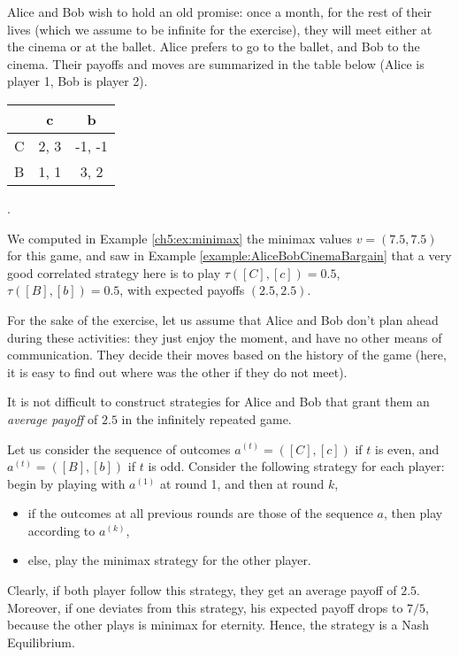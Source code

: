 \begin{example}
Alice and Bob wish to hold an old promise: once a month, for the rest of their lives (which we assume to be infinite for the exercise), they will meet either at the cinema or at the ballet.
Alice prefers to go to the ballet, and Bob to the cinema.
Their payoffs and moves are summarized in the table below (Alice is player 1, Bob is player 2).
\begin{center}
\begin{tabular}{c | c  c}
& c & b\\
\hline
C & 2, 3 & -1, -1  \\
B & 1, 1 & 3, 2
\end{tabular}
.
\end{center}
We computed in Example \ref{ch5:ex:minimax} the minimax values
$v = (7.5, 7.5)$
for this game, and saw in Example \ref{example:AliceBobCinemaBargain} that a very good correlated strategy here is to play $\tau([C],[c]) = 0.5$, $\tau([B],[b]) = 0.5$, with expected payoffs $(2.5,2.5)$.

For the sake of the exercise, let us assume that Alice and Bob don't plan ahead during these activities: they just enjoy the moment, and have no other means of communication.
They decide their moves based on the history of the game (here, it is easy to find out where was the other if they do not meet).

It is not difficult to construct strategies for Alice and Bob that grant them an \emph{average payoff} of $2.5$ in the infinitely repeated game.

Let us consider the sequence of outcomes $a^{(t)} = ([C],[c])$ if $t$ is even, and $a^{(t)} = ([B],[b])$ if $t$ is odd.
Consider the following strategy for each player: begin by playing with $a^{(1)}$ at round 1, and then at round $k$,
\begin{itemize}
\item if the outcomes at all previous rounds are those of the sequence $a$, then play according to $a^{(k)}$,
\item else, play the minimax strategy for the other player.
\end{itemize}
Clearly, if both player follow this strategy, they get an average payoff of $2.5$.
Moreover, if one deviates from this strategy, his expected payoff drops to $7/5$, because the other plays is minimax for eternity. Hence, the strategy is a Nash Equilibrium.
\end{example}




